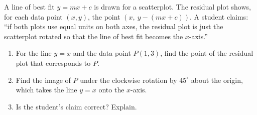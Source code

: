 A line of best fit $y=mx+c$ is drawn for a scatterplot. The residual plot shows, for each data point $(x,y)$, the point $(x,\ y-(mx+c))$. A student claims: ``if both plots use equal units on both axes, the residual plot is just the scatterplot rotated so that the line of best fit becomes the $x$-axis.''
\begin{enumerate}
\item[(a)] For the line $y=x$ and the data point $P(1,3)$, find the point of the residual plot that corresponds to $P$.
\item[(b)] Find the image of $P$ under the clockwise rotation by $45^\circ$ about the origin, which takes the line $y=x$ onto the $x$-axis.
\item[(c)] Is the student's claim correct? Explain.
\end{enumerate}
